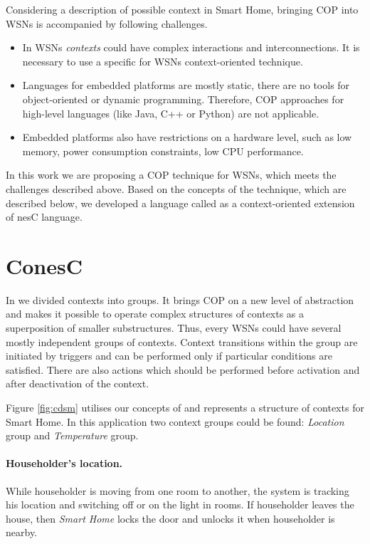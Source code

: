 \documentclass{ubicomp-ext}
\begin{document}
Considering a description of possible context in Smart Home, bringing COP into WSNs is accompanied by following challenges.
\begin{itemize}\compresslist
\item
In WSNs \textit{contexts} could have complex interactions and interconnections. It is necessary to use a specific for WSNs context-oriented technique.
\item
Languages for embedded platforms are mostly static, there are no tools for object-oriented or dynamic programming. Therefore, COP approaches for high-level languages (like Java, C++ or Python) are not applicable.
\item
Embedded platforms also have restrictions on a hardware level, such as low memory, power consumption constraints, low CPU performance.
\end{itemize}

In this work we are proposing a COP technique for WSNs, which meets the challenges described above. Based on the concepts of the technique, which are described below, we developed a language called {} as a context-oriented extension of nesC language.
\section{ConesC}
In {} we divided contexts into groups. It brings COP on a new level of abstraction and makes it possible to operate complex structures of contexts as a superposition of smaller substructures. Thus, every WSNs could have several mostly independent groups of contexts. Context transitions within the group are initiated by triggers and can be performed only if particular conditions are satisfied. There are also actions which should be performed before activation and after deactivation of the context.

Figure \ref{fig:cdsm} utilises our concepts of {} and represents a structure of contexts for Smart Home. In this application two context groups could be found: \textit{Location} group and \textit{Temperature} group.

\paragraph{Householder's location.} While householder is moving from one room to another, the system is tracking his location and switching off or on the light in rooms. If householder leaves the house, then \textit{Smart Home} locks the door and unlocks it when householder is nearby.
\end{document}
